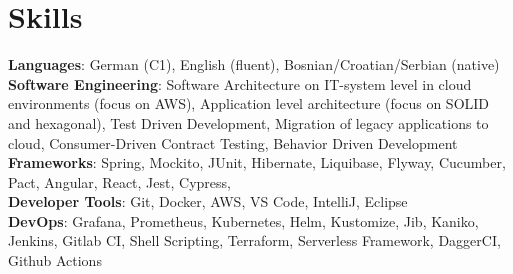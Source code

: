 \documentclass[a4paper,12pt]{article}
\begin{document}
	\section{Skills}
	\begin{itemize}[leftmargin=0.15in, label={}]
		\small{
			\item{
				\textbf{Languages}{: German (C1), English (fluent), Bosnian/Croatian/Serbian (native)} \\
				\textbf{Software Engineering}{: Software Architecture on IT-system level in cloud environments (focus on AWS),
					Application level architecture (focus on SOLID and hexagonal), Test Driven Development, Migration of
					legacy applications to cloud, Consumer-Driven Contract Testing, Behavior Driven Development} \\
				\textbf{Frameworks}{: Spring, Mockito, JUnit, Hibernate, Liquibase, Flyway, Cucumber, Pact, Angular, React, Jest, Cypress, } \\
				\textbf{Developer Tools}{: Git, Docker, AWS, VS Code, IntelliJ, Eclipse} \\
				\textbf{DevOps}{: Grafana, Prometheus, Kubernetes, Helm, Kustomize, Jib, Kaniko, Jenkins, Gitlab CI, Shell Scripting, Terraform, Serverless Framework, DaggerCI, Github Actions}
		}}
	\end{itemize}
\end{document}
